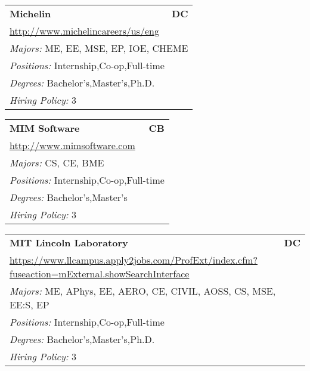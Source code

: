 \documentclass[twoside]{article}
\begin{document}
\begin{center}
\begin{multicols}{3}
\begin{FlushLeft}
\begin{minipage}{.9\columnwidth}
\end{minipage}
 
\begin{minipage}{.9\columnwidth}\begin{tabularx}{.95\columnwidth}{Xr}
                 {\Large\bf Michelin} & {\Large\bf DC}\\
    \multicolumn{2}{p{.95\columnwidth}}{\url{http://www.michelincareers/us/eng}}\\
    \multicolumn{2}{p{.95\columnwidth}}{\emph{Majors:} ME, EE, MSE, EP, IOE, CHEME}\\
    \multicolumn{2}{p{.95\columnwidth}}{\emph{Positions:} Internship,Co-op,Full-time}\\
    \multicolumn{2}{p{.95\columnwidth}}{\emph{Degrees:} Bachelor's,Master's,Ph.D.}\\
    \multicolumn{2}{p{.95\columnwidth}}{\emph{Hiring Policy:} 3}\\
    \end{tabularx}
    
\end{minipage}
 
\begin{minipage}{.9\columnwidth}\begin{tabularx}{.95\columnwidth}{Xr}
                 {\Large\bf MIM Software} & {\Large\bf CB}\\
    \multicolumn{2}{p{.95\columnwidth}}{\url{http://www.mimsoftware.com}}\\
    \multicolumn{2}{p{.95\columnwidth}}{\emph{Majors:} CS, CE, BME}\\
    \multicolumn{2}{p{.95\columnwidth}}{\emph{Positions:} Internship,Co-op,Full-time}\\
    \multicolumn{2}{p{.95\columnwidth}}{\emph{Degrees:} Bachelor's,Master's}\\
    \multicolumn{2}{p{.95\columnwidth}}{\emph{Hiring Policy:} 3}\\
    \end{tabularx}
    
\end{minipage}
 
\begin{minipage}{.9\columnwidth}\begin{tabularx}{.95\columnwidth}{Xr}
                 {\Large\bf MIT Lincoln Laboratory} & {\Large\bf DC}\\
    \multicolumn{2}{p{.95\columnwidth}}{\url{https://www.llcampus.apply2jobs.com/ProfExt/index.cfm?fuseaction=mExternal.showSearchInterface}}\\
    \multicolumn{2}{p{.95\columnwidth}}{\emph{Majors:} ME, APhys, EE, AERO, CE, CIVIL, AOSS, CS, MSE, EE:S, EP}\\
    \multicolumn{2}{p{.95\columnwidth}}{\emph{Positions:} Internship,Co-op,Full-time}\\
    \multicolumn{2}{p{.95\columnwidth}}{\emph{Degrees:} Bachelor's,Master's,Ph.D.}\\
    \multicolumn{2}{p{.95\columnwidth}}{\emph{Hiring Policy:} 3}\\
    \end{tabularx}
    

\end{minipage}
\end{FlushLeft}
\end{multicols}
\end{center}
\end{document}
